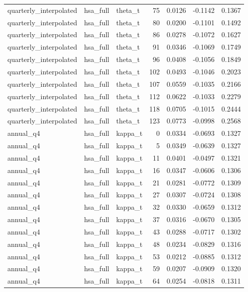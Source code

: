 \begin{tabular}{lllrrrr}
quarterly\_interpolated & hsa\_full & theta\_t & 75 & 0.0126 & -0.1142 & 0.1367 \\
quarterly\_interpolated & hsa\_full & theta\_t & 80 & 0.0200 & -0.1101 & 0.1492 \\
quarterly\_interpolated & hsa\_full & theta\_t & 86 & 0.0278 & -0.1072 & 0.1627 \\
quarterly\_interpolated & hsa\_full & theta\_t & 91 & 0.0346 & -0.1069 & 0.1749 \\
quarterly\_interpolated & hsa\_full & theta\_t & 96 & 0.0408 & -0.1056 & 0.1849 \\
quarterly\_interpolated & hsa\_full & theta\_t & 102 & 0.0493 & -0.1046 & 0.2023 \\
quarterly\_interpolated & hsa\_full & theta\_t & 107 & 0.0559 & -0.1035 & 0.2166 \\
quarterly\_interpolated & hsa\_full & theta\_t & 112 & 0.0622 & -0.1033 & 0.2279 \\
quarterly\_interpolated & hsa\_full & theta\_t & 118 & 0.0705 & -0.1015 & 0.2444 \\
quarterly\_interpolated & hsa\_full & theta\_t & 123 & 0.0773 & -0.0998 & 0.2568 \\
annual\_q4 & hsa\_full & kappa\_t & 0 & 0.0334 & -0.0693 & 0.1327 \\
annual\_q4 & hsa\_full & kappa\_t & 5 & 0.0349 & -0.0639 & 0.1327 \\
annual\_q4 & hsa\_full & kappa\_t & 11 & 0.0401 & -0.0497 & 0.1321 \\
annual\_q4 & hsa\_full & kappa\_t & 16 & 0.0347 & -0.0606 & 0.1306 \\
annual\_q4 & hsa\_full & kappa\_t & 21 & 0.0281 & -0.0772 & 0.1309 \\
annual\_q4 & hsa\_full & kappa\_t & 27 & 0.0307 & -0.0724 & 0.1308 \\
annual\_q4 & hsa\_full & kappa\_t & 32 & 0.0330 & -0.0659 & 0.1312 \\
annual\_q4 & hsa\_full & kappa\_t & 37 & 0.0316 & -0.0670 & 0.1305 \\
annual\_q4 & hsa\_full & kappa\_t & 43 & 0.0288 & -0.0717 & 0.1302 \\
annual\_q4 & hsa\_full & kappa\_t & 48 & 0.0234 & -0.0829 & 0.1316 \\
annual\_q4 & hsa\_full & kappa\_t & 53 & 0.0212 & -0.0885 & 0.1312 \\
annual\_q4 & hsa\_full & kappa\_t & 59 & 0.0207 & -0.0909 & 0.1320 \\
annual\_q4 & hsa\_full & kappa\_t & 64 & 0.0254 & -0.0818 & 0.1311 \\

\end{tabular}
